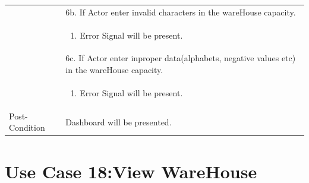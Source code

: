 \documentclass[12pt,a4paper]{report}
\begin{document}
\begin{tabular}{ | m{3cm} | m{12cm}| }
& 6b. If Actor enter invalid characters in the wareHouse capacity. \\
& \begin{enumerate}
		\item Error Signal will be present.
	\end{enumerate}
\\ 
& 6c. If Actor enter inproper data(alphabets, negative values etc) in the wareHouse capacity. \\
& \begin{enumerate}
		\item Error Signal will be present.
	\end{enumerate}


\\ \hline 


Post-Condition &  Dashboard will be presented.  \\ \hline

\end{tabular}






\section{Use Case 18:View WareHouse  }
\end{document}
